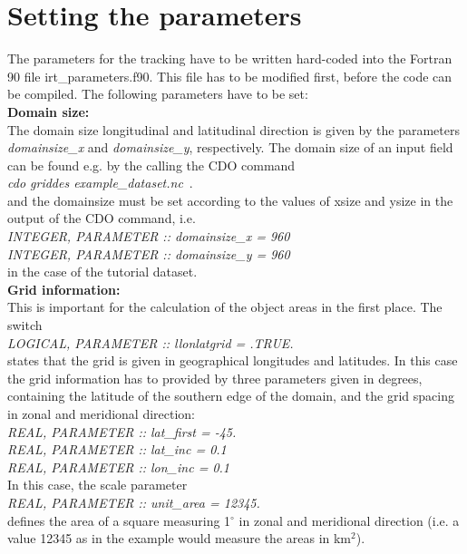 \documentclass[11pt]{article}
\begin{document}
\section{Setting the parameters}\label{sec_parameters}

The parameters for the tracking have to be written hard-coded into the Fortran 90 file irt\_parameters.f90. This file has to be modified first, before the code can be compiled. The following parameters have to be set:\vspace{0.5cm} \\
{\bf Domain size:}\\
The domain size longitudinal and latitudinal direction is given by the parameters {\it domainsize\_x} and {\it domainsize\_y}, respectively. The domain size of an input field can be found e.g. by the calling the CDO command\\
{\it cdo griddes example\_dataset.nc}\, . \\
and the domainsize must be set according to the values of xsize and ysize in the output of the CDO command, i.e.\\
{\it INTEGER, PARAMETER    :: domainsize\_x = 960}\\
{\it INTEGER, PARAMETER    :: domainsize\_y = 960}\\
in the case of the tutorial dataset.\vspace{0.5cm} \\
{\bf Grid information:}\\
This is important for the calculation of the object areas in the first place. The switch\\
{\it LOGICAL, PARAMETER    :: llonlatgrid = .TRUE.}\\
states that the grid is given in geographical longitudes and latitudes. In this case the grid information has to provided by three parameters given in degrees, containing the latitude of the southern edge of the domain, and the grid spacing in zonal and meridional direction: \\
{\it REAL, PARAMETER       :: lat\_first = -45.}\\
{\it REAL, PARAMETER       :: lat\_inc = 0.1}\\
{\it REAL, PARAMETER       :: lon\_inc = 0.1}\\
In this case, the scale parameter\\
{\it REAL, PARAMETER       :: unit\_area = 12345.}\\
defines the area of a square measuring 1$^\circ$ in zonal and meridional direction (i.e. a value 12345 as in the example would measure the areas in km$^2$).
\end{document}
